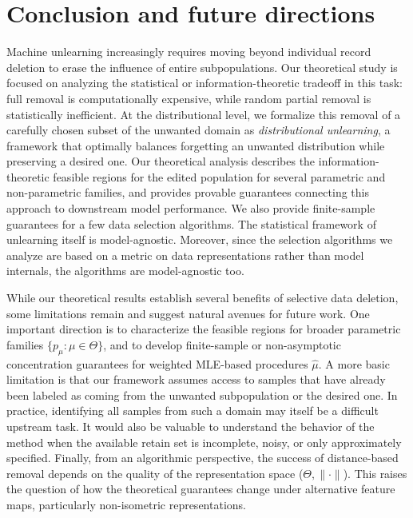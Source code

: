\vspace{-4mm}
\section{Conclusion and future directions}
\label{sec:conclusion}
\vspace{-3mm}
 Machine unlearning increasingly requires moving beyond individual record deletion to erase the influence of entire subpopulations. Our theoretical study is focused on analyzing the statistical or information-theoretic tradeoff in this task: full removal is computationally expensive, while random partial removal is statistically inefficient. At the distributional level, we formalize this removal of a carefully chosen subset of the unwanted domain as \emph{distributional unlearning}, a framework that optimally balances forgetting an unwanted distribution while preserving a desired one. Our theoretical analysis describes the information-theoretic feasible regions for the edited population for several parametric and non-parametric families, and provides provable guarantees connecting this approach to downstream model performance. We also provide finite-sample guarantees for a few data selection algorithms. The statistical framework of unlearning itself is model-agnostic. Moreover, since the selection algorithms we analyze are based on a metric on data representations rather than model internals, the algorithms are model-agnostic too.



While our theoretical results establish several benefits of selective data deletion, some limitations remain and suggest natural avenues for future work. One important direction is to characterize the feasible regions for broader parametric families $\{p_{\mu}: \mu \in \Theta\}$, and to develop finite-sample or non-asymptotic concentration guarantees for weighted MLE-based procedures $\hat{\mu}$. A more basic limitation is that our framework assumes access to samples that have already been labeled as coming from the unwanted subpopulation or the desired one. In practice,  identifying all samples from such a domain may itself be a difficult upstream task. It would also be valuable to understand the behavior of the method when the available retain set is incomplete, noisy, or only approximately specified. Finally, from an algorithmic perspective, the success of distance-based removal depends on the quality of the representation space ($\Theta,\|\cdot\|$). This raises the question of how the theoretical guarantees change under alternative feature maps, particularly non-isometric representations.






